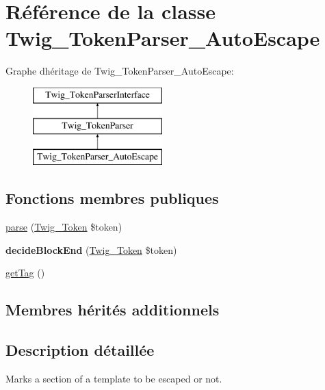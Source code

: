 \hypertarget{class_twig___token_parser___auto_escape}{}\section{Référence de la classe Twig\+\_\+\+Token\+Parser\+\_\+\+Auto\+Escape}
\label{class_twig___token_parser___auto_escape}
Graphe d\textquotesingle{}héritage de Twig\+\_\+\+Token\+Parser\+\_\+\+Auto\+Escape\+:\begin{figure}[H]
\begin{center}
\leavevmode
\includegraphics[height=3.000000cm]{class_twig___token_parser___auto_escape}
\end{center}
\end{figure}
\subsection*{Fonctions membres publiques}
\begin{DoxyCompactItemize}
\item 
\hyperlink{class_twig___token_parser___auto_escape_a5dfa2e269321584fb74e8b43dabe0efd}{parse} (\hyperlink{class_twig___token}{Twig\+\_\+\+Token} \$token)
\item 
{\bfseries decide\+Block\+End} (\hyperlink{class_twig___token}{Twig\+\_\+\+Token} \$token)\hypertarget{class_twig___token_parser___auto_escape_aa976dc013d35c2813752149bacd88902}{}\label{class_twig___token_parser___auto_escape_aa976dc013d35c2813752149bacd88902}

\item 
\hyperlink{class_twig___token_parser___auto_escape_ab86ba36154b20e6bbfa3ba705f12f9d6}{get\+Tag} ()
\end{DoxyCompactItemize}
\subsection*{Membres hérités additionnels}


\subsection{Description détaillée}
Marks a section of a template to be escaped or not.


